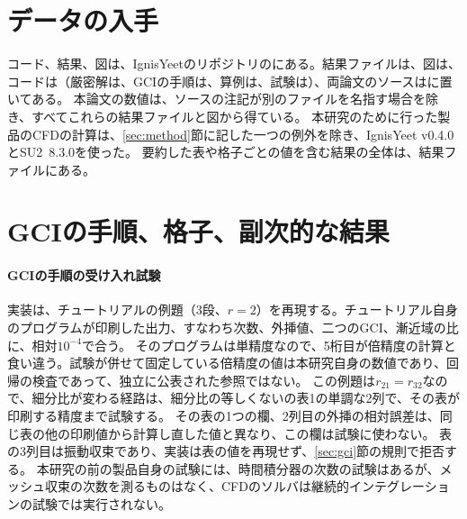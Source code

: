 \documentclass[twocolumn]{labreport}
\begin{document}
\section*{データの入手}
コード、結果、図は、IgnisYeetのリポジトリのにある。結果ファイルは、図は、コードは（厳密解は、GCIの手順は、算例は、試験は）、両論文のソースはに置いてある。
本論文の数値は、ソースの注記が別のファイルを名指す場合を除き、すべてこれらの結果ファイルと図から得ている。
本研究のために行った製品のCFDの計算は、\ref{sec:method}節に記した一つの例外を除き、IgnisYeet v0.4.0とSU2~8.3.0を使った。
要約した表や格子ごとの値を含む結果の全体は、結果ファイルにある。




\appendix

\section{GCIの手順、格子、副次的な結果}
\label{sec:appA}

\paragraph{GCIの手順の受け入れ試験}
実装は、チュートリアルの例題\citep{nparc_spatial}（3段、$r=2$）を再現する。チュートリアル自身のプログラムが印刷した出力、すなわち次数、外挿値、二つのGCI、漸近域の比に、相対$10^{-4}$で合う。
そのプログラムは単精度なので、5桁目が倍精度の計算と食い違う。試験が併せて固定している倍精度の値は本研究自身の数値であり、回帰の検査であって、独立に公表された参照ではない。
この例題は$r_{21}=r_{32}$なので、細分比が変わる経路は、細分比の等しくない\citet{celik2008}の表1の単調な2列で、その表が印刷する精度まで試験する。
その表の1つの欄、2列目の外挿の相対誤差は、同じ表の他の印刷値から計算し直した値と異なり、この欄は試験に使わない。
表の3列目は振動収束であり、実装は表の値を再現せず、\ref{sec:gci}節の規則で拒否する。
本研究の前の製品自身の試験には、時間積分器の次数の試験はあるが、メッシュ収束の次数を測るものはなく、CFDのソルバは継続的インテグレーションの試験では実行されない。
\end{document}

